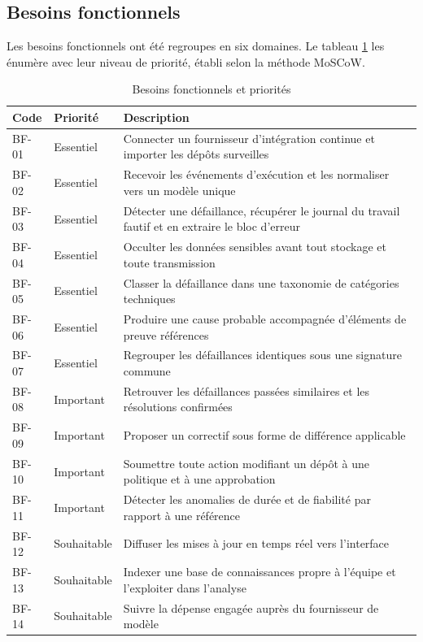 \documentclass[12pt,a4paper,oneside]{report}
\begin{document}
\subsection{Besoins fonctionnels}

Les besoins fonctionnels ont été regroupes en six domaines. Le tableau
\ref{tab:besoins} les énumère avec leur niveau de priorité, établi selon la
méthode MoSCoW.

\begin{table}[htbp]
\centering
\caption{Besoins fonctionnels et priorités}
\label{tab:besoins}
\small
\begin{tabularx}{\textwidth}{@{}llX@{}}
\toprule
\textbf{Code} & \textbf{Priorité} & \textbf{Description} \\
\midrule
BF-01 & Essentiel & Connecter un fournisseur d'intégration continue et importer les dépôts surveilles \\
BF-02 & Essentiel & Recevoir les événements d'exécution et les normaliser vers un modèle unique \\
BF-03 & Essentiel & Détecter une défaillance, récupérer le journal du travail fautif et en extraire le bloc d'erreur \\
BF-04 & Essentiel & Occulter les données sensibles avant tout stockage et toute transmission \\
BF-05 & Essentiel & Classer la défaillance dans une taxonomie de catégories techniques \\
BF-06 & Essentiel & Produire une cause probable accompagnée d'éléments de preuve références \\
BF-07 & Essentiel & Regrouper les défaillances identiques sous une signature commune \\
BF-08 & Important & Retrouver les défaillances passées similaires et les résolutions confirmées \\
BF-09 & Important & Proposer un correctif sous forme de différence applicable \\
BF-10 & Important & Soumettre toute action modifiant un dépôt à une politique et à une approbation \\
BF-11 & Important & Détecter les anomalies de durée et de fiabilité par rapport à une référence \\
BF-12 & Souhaitable & Diffuser les mises à jour en temps réel vers l'interface \\
BF-13 & Souhaitable & Indexer une base de connaissances propre à l'équipe et l'exploiter dans l'analyse \\
BF-14 & Souhaitable & Suivre la dépense engagée auprès du fournisseur de modèle \\
\bottomrule
\end{tabularx}
\end{table}
\end{document}
